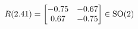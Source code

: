 \documentclass[preview]{standalone}
\begin{document}
\begin{align*}
\special{dvisvgm:raw <g id='unique000'>}R(2.41) = \begin{bmatrix} -0.75 & -0.67 \\ 0.67 & -0.75 \end{bmatrix} \in \text{SO}(2)\special{dvisvgm:raw </g>}
\end{align*}
\end{document}
